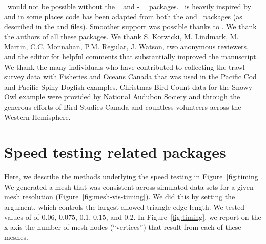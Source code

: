 \documentclass[article]{jss}\usepackage[]{graphicx}\usepackage[dvipsnames]{xcolor}
\newcommand{\sdmTMB}{\pkg{sdmTMB}}
\newcommand{\INLA}{\proglang{R}-\pkg{INLA}}
\newcommand{\TMB}{\pkg{TMB}}
\newcommand{\R}{\proglang{R}}
\begin{document}
\sdmTMB\ would not be possible without the \TMB\ \citep{kristensen2016} and \INLA\ \citep{rue2009, lindgren2011, lindgren2015} \R\ packages.
\sdmTMB\ is heavily inspired by and in some places code has been adapted from both the  \citep{thorson2019} and  \citep{brooks2017} \R\ packages (as described in the  and  files).
Smoother support was possible thanks to  \citep{wood2017a}.
We thank the authors of all these packages.
We thank S. Kotwicki, M. Lindmark, M. Martin, C.C. Monnahan, P.M. Regular, J. Watson, two anonymous reviewers, and the editor for helpful comments that substantially improved the manuscript.
We thank the many individuals who have contributed to collecting the trawl survey data with Fisheries and Oceans Canada that was used in the Pacific Cod and Pacific Spiny Dogfish examples.
Christmas Bird Count data for the Snowy Owl example were provided by National Audubon Society and through the generous efforts of Bird Studies Canada and countless volunteers across the Western Hemisphere.







\newpage

\clearpage

\appendix

\section{Speed testing related packages}\label{app:speed}

Here, we describe the methods underlying the speed testing in Figure~\ref{fig:timing}.
We generated a mesh that was consistent across simulated data sets for a given mesh resolution (Figure~\ref{fig:mesh-vis-timing}).
We did this by setting the  argument, which controls the largest allowed triangle edge length.
We tested values of  of 0.06, 0.075, 0.1, 0.15, and 0.2.
In Figure~\ref{fig:timing}, we report on the x-axis the number of mesh nodes (``vertices'') that result from each of these meshes.
\end{document}

